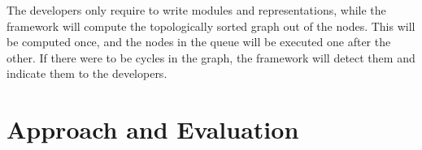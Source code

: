 \documentclass[letterpaper]{article}
\begin{document}
The developers only require to write 
modules and representations, while the framework will compute the topologically sorted graph out of 
the nodes. This will be computed once, and the nodes in the queue will be executed one after the 
other. If there were to be cycles in the graph, the framework will detect them and indicate them to 
the developers.


\section{Approach and Evaluation}

\begin{figure}[!t]
\centering
{} 
\\
\end{figure}
\end{document}

